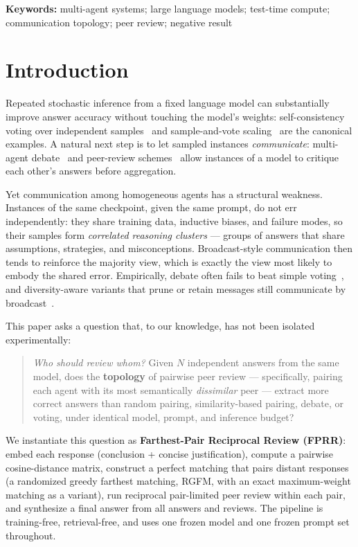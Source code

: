 \documentclass[11pt]{article}
\begin{document}
\noindent\textbf{Keywords:} multi-agent systems; large language models; test-time compute; communication topology; peer review; negative result

\section{Introduction}
\label{sec:intro}

Repeated stochastic inference from a fixed language model can substantially improve answer accuracy without touching the model's weights: self-consistency voting over independent samples~\cite{wang2022selfconsistency} and sample-and-vote scaling~\cite{li2024moreagents} are the canonical examples. A natural next step is to let sampled instances \emph{communicate}: multi-agent debate~\cite{du2023multiagent} and peer-review schemes~\cite{xu2023peerreview} allow instances of a model to critique each other's answers before aggregation.

Yet communication among homogeneous agents has a structural weakness. Instances of the same checkpoint, given the same prompt, do not err independently: they share training data, inductive biases, and failure modes, so their samples form \emph{correlated reasoning clusters} — groups of answers that share assumptions, strategies, and misconceptions. Broadcast-style communication then tends to reinforce the majority view, which is exactly the view most likely to embody the shared error. Empirically, debate often fails to beat simple voting~\cite{yang2025revisiting,choi2025debateorvote}, and diversity-aware variants that prune or retain messages still communicate by broadcast~\cite{estornell2024multillm,nguyen2026dars}.

This paper asks a question that, to our knowledge, has not been isolated experimentally:

\begin{quote}
\emph{Who should review whom?} Given $N$ independent answers from the same model, does the \textbf{topology} of pairwise peer review — specifically, pairing each agent with its most semantically \emph{dissimilar} peer — extract more correct answers than random pairing, similarity-based pairing, debate, or voting, under identical model, prompt, and inference budget?
\end{quote}

We instantiate this question as \textbf{Farthest-Pair Reciprocal Review (FPRR)}: embed each response (conclusion + concise justification), compute a pairwise cosine-distance matrix, construct a perfect matching that pairs distant responses (a randomized greedy farthest matching, RGFM, with an exact maximum-weight matching as a variant), run reciprocal pair-limited peer review within each pair, and synthesize a final answer from all answers and reviews. The pipeline is training-free, retrieval-free, and uses one frozen model and one frozen prompt set throughout.
\end{document}
